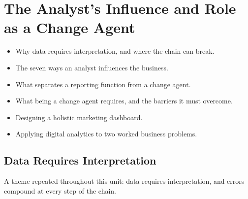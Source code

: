 \chapter{The Analyst's Influence and Role as a Change Agent}


\begin{learningoutcomes}
\begin{itemize}
\item Why data requires interpretation, and where the chain can break.
\item The seven ways an analyst influences the business.
\item What separates a reporting function from a change agent.
\item What being a change agent requires, and the barriers it must overcome.
\item Designing a holistic marketing dashboard.
\item Applying digital analytics to two worked business problems.
\end{itemize}
\end{learningoutcomes}

\section{Data Requires Interpretation}

A theme repeated throughout this unit: data requires interpretation, and errors
compound at every step of the chain.

